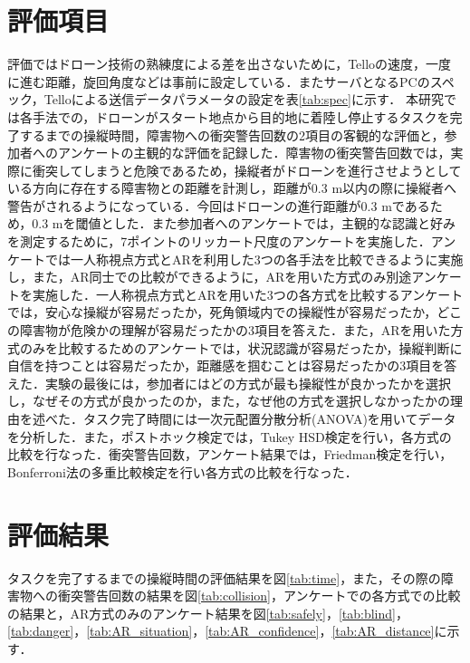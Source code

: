 \documentclass
[a4paper,11pt]{jreport}
\begin{document}






\section{評価項目}
評価ではドローン技術の熟練度による差を出さないために，Telloの速度，一度に進む距離，旋回角度などは事前に設定している．またサーバとなるPCのスペック，Telloによる送信データパラメータの設定を表\ref{tab:spec}に示す．
本研究では各手法での，ドローンがスタート地点から目的地に着陸し停止するタスクを完了するまでの操縦時間，障害物への衝突警告回数の2項目の客観的な評価と，参加者へのアンケートの主観的な評価を記録した．障害物の衝突警告回数では，実際に衝突してしまうと危険であるため，操縦者がドローンを進行させようとしている方向に存在する障害物との距離を計測し，距離が0.3 m以内の際に操縦者へ警告がされるようになっている．今回はドローンの進行距離が0.3 mであるため，0.3 mを閾値とした．また参加者へのアンケートでは，主観的な認識と好みを測定するために，7ポイントのリッカート尺度のアンケートを実施した．アンケートでは一人称視点方式とARを利用した3つの各手法を比較できるように実施し，また，AR同士での比較ができるように，ARを用いた方式のみ別途アンケートを実施した．一人称視点方式とARを用いた3つの各方式を比較するアンケートでは，安心な操縦が容易だったか，死角領域内での操縦性が容易だったか，どこの障害物が危険かの理解が容易だったかの3項目を答えた．また，ARを用いた方式のみを比較するためのアンケートでは，状況認識が容易だったか，操縦判断に自信を持つことは容易だったか，距離感を掴むことは容易だったかの3項目を答えた．実験の最後には，参加者にはどの方式が最も操縦性が良かったかを選択し，なぜその方式が良かったのか，また，なぜ他の方式を選択しなかったかの理由を述べた．タスク完了時間には一次元配置分散分析(ANOVA)を用いてデータを分析した．また，ポストホック検定では，Tukey HSD検定を行い，各方式の比較を行なった．衝突警告回数，アンケート結果では，Friedman検定を行い，Bonferroni法の多重比較検定を行い各方式の比較を行なった．



\section{評価結果}
タスクを完了するまでの操縦時間の評価結果を図\ref{tab:time}，また，その際の障害物への衝突警告回数の結果を図\ref{tab:collision}，アンケートでの各方式での比較の結果と，AR方式のみのアンケート結果を図\ref{tab:safely}，\ref{tab:blind}，\ref{tab:danger}，\ref{tab:AR_situation}，\ref{tab:AR_confidence}，\ref{tab:AR_distance}に示す．
\end{document}
